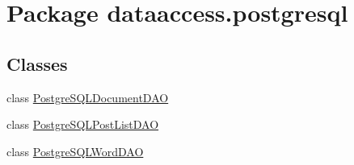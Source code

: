 \hypertarget{namespacedataaccess_1_1postgresql}{\section{\-Package dataaccess.\-postgresql}
\label{namespacedataaccess_1_1postgresql}
}
\subsection*{\-Classes}
\begin{DoxyCompactItemize}
\item 
class \hyperlink{classdataaccess_1_1postgresql_1_1_postgre_s_q_l_document_d_a_o}{\-Postgre\-S\-Q\-L\-Document\-D\-A\-O}
\item 
class \hyperlink{classdataaccess_1_1postgresql_1_1_postgre_s_q_l_post_list_d_a_o}{\-Postgre\-S\-Q\-L\-Post\-List\-D\-A\-O}
\item 
class \hyperlink{classdataaccess_1_1postgresql_1_1_postgre_s_q_l_word_d_a_o}{\-Postgre\-S\-Q\-L\-Word\-D\-A\-O}
\end{DoxyCompactItemize}
